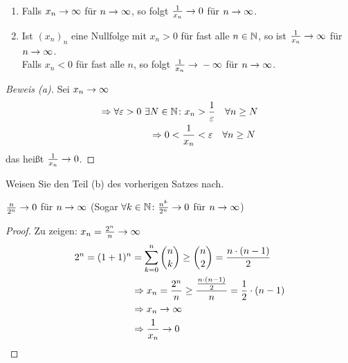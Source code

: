 \begin{satz}
    \theoremescape
    \begin{enumerate}[label=(\alph*)]
        \item Falls $x_n\rightarrow{} \infty$ für $n\rightarrow{}\infty$, so folgt $\frac{1}{x_n}\rightarrow{} 0$ für $n\rightarrow{}\infty$.
        \item Ist $(x_n)_n$ eine Nullfolge mit $x_n > 0$ für fast alle $n\in\mathbb{N}$, so ist $\frac{1}{x_n}\rightarrow{} \infty$ für $n\rightarrow{}\infty$.\\
        Falls $x_n < 0$ für fast alle $n$, so folgt $\frac{1}{x_n} \rightarrow{} -\infty$ für $n\rightarrow{}\infty$.
    \end{enumerate}

    \begin{proof}[Beweis (a)]
        Sei $x_n\rightarrow{} \infty$
        \begin{align*}
            \Rightarrow{} \forall \varepsilon > 0~\exists N\in\mathbb{N}\colon x_n &> \frac{1}{\varepsilon}\quad\forall n \geq N\\
            \Rightarrow{} 0 < \frac{1}{x_n} &< \varepsilon\quad \forall n \geq N
        \end{align*}
        das heißt $\frac{1}{x_n}\rightarrow{} 0$.
    \end{proof}
\end{satz}

\begin{uebung}
    Weisen Sie den Teil (b) des vorherigen Satzes nach.
\end{uebung}

\begin{beispiel}
    $\frac{n}{2^n}\rightarrow{} 0$ für $n\rightarrow{}\infty$ (Sogar $\forall k\in\mathbb{N}\colon \frac{n^k}{2^n} \rightarrow{} 0$ für $n\rightarrow{}\infty$)

    \begin{proof}
        Zu zeigen: $x_n = \frac{2^n}{n}\rightarrow{} \infty$
        \begin{align*}
            2^n = (1+1)^n &= \sum_{k=0}^{n} \binom{n}{k}\geq \binom{n}{2} = \frac{n\cdot (n-1)}{2}\\
            &\Rightarrow{} x_n = \frac{2^n}{n}\geq \frac{\frac{n\cdot (n-1)}{2}}{n} = \frac{1}{2}\cdot (n-1)\\
            &\Rightarrow{} x_n \rightarrow{} \infty\\
            &\Rightarrow{} \frac{1}{x_n}\rightarrow{} 0\qedhere
        \end{align*}
    \end{proof}
\end{beispiel}

